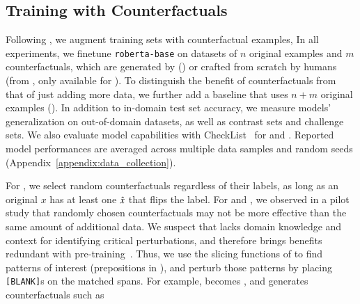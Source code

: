 \subsection{Training with Counterfactuals}

\label{subsec:augmentation}
Following \citet{kaushik2019learning}, we augment training sets with counterfactual examples,
In all experiments, we finetune \texttt{roberta-base} on datasets of $n$ original examples and $m$ counterfactuals, which are generated by \sysname (\maug) or crafted from scratch by humans (\mcad from \citet{kaushik2019learning}, only available for \nli). To distinguish the benefit of counterfactuals from that of just adding more data, we further add a baseline that uses $n+m$ original examples (\mcomp).
In addition to in-domain test set accuracy, we measure models' generalization on out-of-domain datasets, as well as contrast sets and challenge sets.
We also evaluate model capabilities with CheckList~\cite{checklist:acl20} for \sst and \qqp.
Reported model performances are averaged across multiple data samples and random seeds (Appendix~\ref{appendix:data_collection}).


For \sst, we select random \sysname counterfactuals regardless of their labels, as long as an original $x$ has at least one $\hat{x}$ that flips the label.
For \nli and \qqp, we observed in a pilot study that randomly chosen counterfactuals may not be more effective than the same amount of additional data.
We suspect that \sysname lacks domain knowledge and context for identifying critical perturbations, and therefore brings benefits redundant with pre-training~\cite{longpre2020effective}.
Thus, we use the slicing functions of \citet{chen2019slice} to find patterns of interest (\eg prepositions in \nli), and perturb those patterns by placing \texttt{[BLANK]}s on the matched spans. For example,  becomes , and \sysname generates counterfactuals such as 


